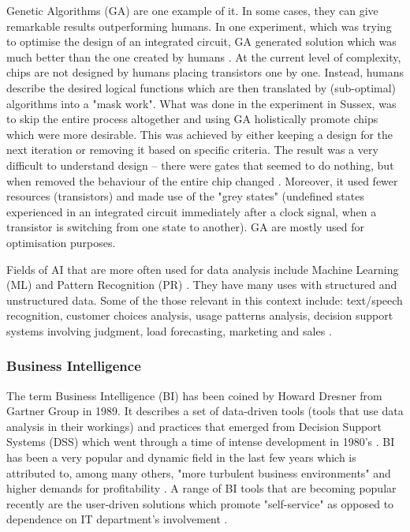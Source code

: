 Genetic Algorithms (GA) are one example of it. In some cases, they can give remarkable results outperforming humans. In one experiment, which was trying to optimise the design of an integrated circuit, GA generated solution which was much better than the one created by humans \citep{Harvey1997}. At the current level of complexity, chips are not designed by humans placing transistors one by one. Instead, humans describe the desired logical functions which are then translated by (sub-optimal) algorithms into a "mask work". What was done in the experiment in Sussex, was to skip the entire process altogether and using GA holistically promote chips which were more desirable. This was achieved by either keeping a design for the next iteration or removing it based on specific criteria. The result was a very difficult to understand design – there were gates that seemed to do nothing, but when removed the behaviour of the entire chip changed \citep{Harvey1997}. Moreover, it used fewer resources (transistors) and made use of the "grey states" (undefined states experienced in an integrated circuit immediately after a clock signal, when a transistor is switching from one state to another). GA are mostly used for optimisation purposes.

Fields of AI that are more often used for data analysis include Machine Learning (ML) and Pattern Recognition (PR) \citep{bishop2006pattern}. They have many uses with structured and unstructured data. Some of the those relevant in this context include: text/speech recognition, customer choices analysis, usage patterns analysis, decision support systems involving judgment, load forecasting, marketing and sales \citep{witten2005data}.
			
			\subsubsection{Business Intelligence}
			
The term Business Intelligence (BI) has been coined by Howard Dresner from Gartner Group in 1989. It describes a set of data-driven tools (tools that use data analysis in their workings) and practices that emerged from Decision Support Systems (DSS) which went through a time of intense development in 1980's \citep{power2008decision}. BI has been a very popular and dynamic field in the last few years which is attributed to, among many others, "more turbulent business environments" and higher demands for profitability \citep{sacu2010bidm, power2008decision, baars2008management}. A range of BI tools that are becoming popular recently are the user-driven solutions which promote "self-service" as opposed to dependence on IT department's involvement \citep{IBM2015a, Qlik2015, Microsoft2015, imhoff2011self}.

